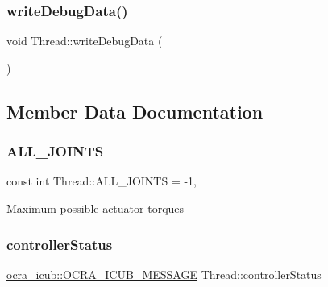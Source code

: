 \hypertarget{classThread_a9af0e98aa9b1de2f5c7bfa2f6e5001a2}{}\label{classThread_a9af0e98aa9b1de2f5c7bfa2f6e5001a2} 
\subsubsection{\texorpdfstring{write\+Debug\+Data()}{writeDebugData()}}
{\footnotesize\ttfamily void Thread\+::write\+Debug\+Data (\begin{DoxyParamCaption}{ }\end{DoxyParamCaption})\hspace{0.3cm}{\ttfamily [private]}}



\subsection{Member Data Documentation}
\hypertarget{classThread_a875b3311a39e3b87dbc981f2db7b1b9d}{}\label{classThread_a875b3311a39e3b87dbc981f2db7b1b9d} 
\subsubsection{\texorpdfstring{A\+L\+L\+\_\+\+J\+O\+I\+N\+TS}{ALL\_JOINTS}}
{\footnotesize\ttfamily const int Thread\+::\+A\+L\+L\+\_\+\+J\+O\+I\+N\+TS = -\/1\hspace{0.3cm}{\ttfamily [static]}, {\ttfamily [private]}}

Maximum possible actuator torques \hypertarget{classThread_a913cf23e86cdaefd036b782f7417254d}{}\label{classThread_a913cf23e86cdaefd036b782f7417254d} 
\subsubsection{\texorpdfstring{controller\+Status}{controllerStatus}}
{\footnotesize\ttfamily \hyperlink{namespaceocra__icub_afbd2db66b68005fb7cfac19210caf83f}{ocra\+\_\+icub\+::\+O\+C\+R\+A\+\_\+\+I\+C\+U\+B\+\_\+\+M\+E\+S\+S\+A\+GE} Thread\+::controller\+Status\hspace{0.3cm}{\ttfamily [private]}}

\hypertarget{classThread_af96a166364f0c6a680115600b3bd232e}{}\label{classThread_af96a166364f0c6a680115600b3bd232e} 

